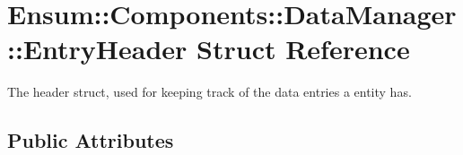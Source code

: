 \hypertarget{struct_ensum_1_1_components_1_1_data_manager_1_1_entry_header}{}\section{Ensum\+:\+:Components\+:\+:Data\+Manager\+:\+:Entry\+Header Struct Reference}
\label{struct_ensum_1_1_components_1_1_data_manager_1_1_entry_header}


The header struct, used for keeping track of the data entries a entity has.  


\subsection*{Public Attributes}
